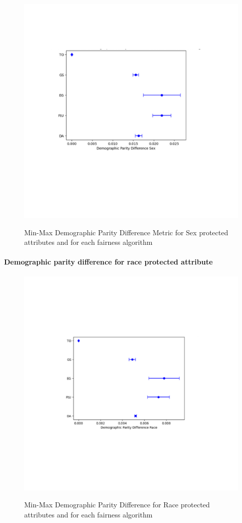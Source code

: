 \begin{figure}[H]
    \centering
    \includegraphics[width=1.0\textwidth, height=1.0\textwidth]{dpds.png}
    \label{fig:dpds}
    \caption{Min-Max Demographic Parity Difference Metric for Sex protected attributes and for each fairness algorithm}
\end{figure}

\paragraph{Demographic parity difference for race protected attribute}

\begin{figure}[H]
    \centering
    \includegraphics[width=1.0\textwidth, height=1.0\textwidth]{dpdr.png}
    \label{fig:dpdr}
    \caption{Min-Max Demographic Parity Difference for Race protected attributes and for each fairness algorithm}
\end{figure}